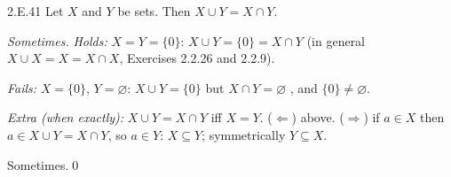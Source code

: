 \begin{bookex}[recommended]{2.E.41}
Let $X$ and $Y$ be sets. Then $X\cup Y=X\cap Y$.
\solution
\begin{steps}
\item \emph{Sometimes.} \emph{Holds:} $X=Y=\{0\}$: $X\cup Y=\{0\}=X\cap Y$ (in general $X\cup X=X=X\cap X$, Exercises 2.2.26 and 2.2.9).
\item \emph{Fails:} $X=\{0\}$, $Y=\varnothing$: $X\cup Y=\{0\}$ but $X\cap Y=\varnothing$ , and $\{0\}\ne\varnothing$.
\item \emph{Extra (when exactly):} $X\cup Y=X\cap Y$ iff $X=Y$. ($\Leftarrow$) above. ($\Rightarrow$) if $a\in X$ then $a\in X\cup Y=X\cap Y$, so $a\in Y$: $X\subseteq Y$; symmetrically $Y\subseteq X$.
\end{steps}
\conclusion Sometimes.\qed
\end{bookex}

